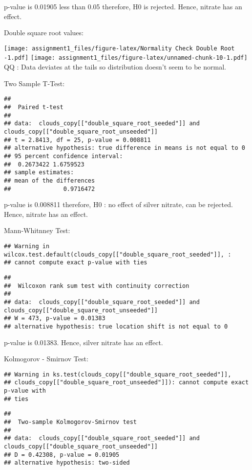 \documentclass[
]{article}
\begin{document}
p-value is 0.01905 less than 0.05 therefore, H0 is rejected. Hence,
nitrate has an effect.

Double square root values:

\texttt{[image: assignment1\_files/figure-latex/Normality Check Double Root -1.pdf]}
\texttt{[image: assignment1\_files/figure-latex/unnamed-chunk-10-1.pdf]}
QQ : Data deviates at the tails so distribution doesn't seem to be
normal.

Two Sample T-Test:

\begin{verbatim}
## 
##  Paired t-test
## 
## data:  clouds_copy[["double_square_root_seeded"]] and clouds_copy[["double_square_root_unseeded"]]
## t = 2.8413, df = 25, p-value = 0.008811
## alternative hypothesis: true difference in means is not equal to 0
## 95 percent confidence interval:
##  0.2673422 1.6759523
## sample estimates:
## mean of the differences 
##               0.9716472
\end{verbatim}

p-value is 0.008811 therefore, H0 : no effect of silver nitrate, can be
rejected. Hence, nitrate has an effect.

Mann-Whitnney Test:

\begin{verbatim}
## Warning in wilcox.test.default(clouds_copy[["double_square_root_seeded"]], :
## cannot compute exact p-value with ties
\end{verbatim}

\begin{verbatim}
## 
##  Wilcoxon rank sum test with continuity correction
## 
## data:  clouds_copy[["double_square_root_seeded"]] and clouds_copy[["double_square_root_unseeded"]]
## W = 473, p-value = 0.01383
## alternative hypothesis: true location shift is not equal to 0
\end{verbatim}

p-value is 0.01383. Hence, silver nitrate has an effect.

Kolmogorov - Smirnov Test:

\begin{verbatim}
## Warning in ks.test(clouds_copy[["double_square_root_seeded"]],
## clouds_copy[["double_square_root_unseeded"]]): cannot compute exact p-value with
## ties
\end{verbatim}

\begin{verbatim}
## 
##  Two-sample Kolmogorov-Smirnov test
## 
## data:  clouds_copy[["double_square_root_seeded"]] and clouds_copy[["double_square_root_unseeded"]]
## D = 0.42308, p-value = 0.01905
## alternative hypothesis: two-sided
\end{verbatim}
\end{document}
